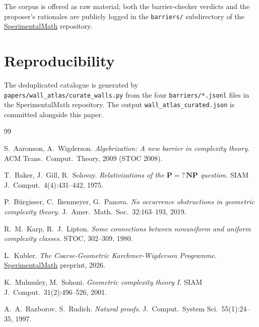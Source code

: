 \documentclass[11pt,a4paper]{article}
\begin{document}
The corpus is offered as raw material; both the barrier-checker
verdicts and the proposer's rationales are publicly logged in the
\texttt{barriers/} subdirectory of the
\href{https://github.com/ludwigkubler/SperimentalMath}{SperimentalMath} repository.

\section*{Reproducibility}

The deduplicated catalogue is generated by
\texttt{papers/wall\_atlas/curate\_walls.py} from the four
\texttt{barriers/*.jsonl} files in the SperimentalMath repository. The
output \texttt{wall\_atlas\_curated.json} is committed alongside this
paper.

\begin{thebibliography}{99}

S.~Aaronson, A.~Wigderson.
\emph{Algebrization: A new barrier in complexity theory.}
ACM Trans.\ Comput.\ Theory, 2009 (STOC 2008).

T.~Baker, J.~Gill, R.~Solovay.
\emph{Relativizations of the $\mathbf{P}=?\,\mathbf{NP}$ question.}
SIAM J.\ Comput.\ 4(4):431--442, 1975.

P.~Bürgisser, C.~Ikenmeyer, G.~Panova.
\emph{No occurrence obstructions in geometric complexity theory.}
J.\ Amer.\ Math.\ Soc.\ 32:163--193, 2019.

R.~M.~Karp, R.~J.~Lipton.
\emph{Some connections between nonuniform and uniform complexity classes.}
STOC, 302--309, 1980.

L.~Kubler.
\emph{The Coarse-Geometric Karchmer-Wigderson Programme.}
\href{https://github.com/ludwigkubler/SperimentalMath}{SperimentalMath} preprint, 2026.

K.~Mulmuley, M.~Sohoni.
\emph{Geometric complexity theory I.}
SIAM J.\ Comput.\ 31(2):496--526, 2001.

A.~A.~Razborov, S.~Rudich.
\emph{Natural proofs.}
J.\ Comput.\ System Sci.\ 55(1):24--35, 1997.

\end{thebibliography}
\end{document}
